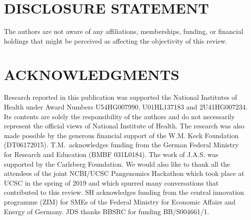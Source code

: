 
\section*{DISCLOSURE STATEMENT}
The authors are not aware of any affiliations, memberships, funding, or financial holdings that
might be perceived as affecting the objectivity of this review. 

\section*{ACKNOWLEDGMENTS}
Research reported in this publication was supported the National Institutes of Health under Award Numbers U54HG007990, U01HL137183 and 2U41HG007234. Its contents are solely the responsibility of the authors and do not necessarily represent the official views of National Institute of Health. The research was also made possible by the generous financial support of the W.M. Keck Foundation (DT06172015). T.M.\ acknowledges funding from the German Federal Ministry for Research and Education (BMBF 031L0184). The work of J.A.S. was supported by the Carlsberg Foundation. We would also like to thank all the attendees of the joint NCBI/UCSC Pangenomics Hackathon which took place at UCSC in the spring of 2019 and which spurred many conversations that contributed to this review. SH acknowledges funding from the central innovation programme (ZIM) for SMEs of the Federal Ministry for Economic Affairs and Energy of Germany. JDS thanks BBSRC for funding BB/S004661/1.

